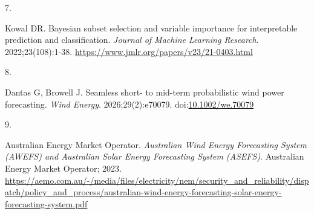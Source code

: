 \documentclass[
  british,
  11pt,
]{article}
\newlength{\cslhangindent}
\newlength{\csllabelwidth}
\newenvironment{CSLReferences}[2] %
 {\begin{list}{}{%
  \setlength{\itemindent}{0pt}
  \setlength{\leftmargin}{0pt}
  \setlength{\parsep}{0pt}
  \ifodd #1
   \setlength{\leftmargin}{\cslhangindent}
   \setlength{\itemindent}{-1\cslhangindent}
  \fi
  \setlength{\itemsep}{#2\baselineskip}}}
 {\end{list}}
\newcommand{\CSLLeftMargin}[1]{\parbox[t]{\csllabelwidth}{\strut#1\strut}}
\newcommand{\CSLRightInline}[1]{\parbox[t]{\linewidth - \csllabelwidth}{\strut#1\strut}}
\begin{document}
\begin{CSLReferences}{0}{1}
\CSLLeftMargin{7. }%
\CSLRightInline{Kowal DR. Bayesian subset selection and variable
importance for interpretable prediction and classification.
\emph{Journal of Machine Learning Research}. 2022;23(108):1-38.
\url{https://www.jmlr.org/papers/v23/21-0403.html}}

\CSLLeftMargin{8. }%
\CSLRightInline{Dantas G, Browell J. Seamless short- to mid-term
probabilistic wind power forecasting. \emph{Wind Energy}.
2026;29(2):e70079.
doi:\href{https://doi.org/10.1002/we.70079}{10.1002/we.70079}}

\CSLLeftMargin{9. }%
\CSLRightInline{Australian Energy Market Operator. \emph{Australian Wind
Energy Forecasting System ({AWEFS}) and Australian Solar Energy
Forecasting System ({ASEFS})}. Australian Energy Market Operator; 2023.
\url{https://aemo.com.au/-/media/files/electricity/nem/security_and_reliability/dispatch/policy_and_process/australian-wind-energy-forecasting-solar-energy-forecasting-system.pdf}}

\end{CSLReferences}
\end{document}
